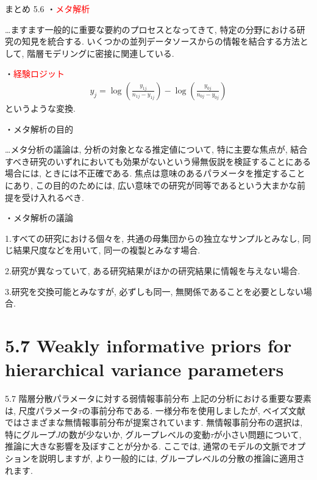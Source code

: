 \documentclass[10pt,dvipdfmx,a4]{beamer}
\newcommand{\eqn}[1]{\begin{align*}#1\end{align*}}
\newcommand{\tcr}[1]{\textcolor{red}{#1}}
\begin{document}

\begin{frame}{まとめ 5.6}
・\tcr{メタ解析}

…ますます一般的に重要な要約のプロセスとなってきて, 特定の分野における研究の知見を統合する.
いくつかの並列データソースからの情報を結合する方法として, 階層モデリングに密接に関連している.

・\tcr{経験ロジット}
\eqn{y_j=\log \left(\tfrac{y_{1j}}{n_{1j}-y_{1j}}\right)-\log \left(\tfrac{y_{0j}}{n_{0j}-y_{0j}}\right)}
というような変換.

・メタ解析の目的

…メタ分析の議論は, 分析の対象となる推定値について, 特に主要な焦点が, 結合すべき研究のいずれにおいても効果がないという帰無仮説を検証することにある場合には, ときには不正確である.
焦点は意味のあるパラメータを推定することにあり, この目的のためには, 広い意味での研究が同等であるという大まかな前提を受け入れるべき.
\end{frame}


\begin{frame}
・メタ解析の議論

1.すべての研究における個々を, 共通の母集団からの独立なサンプルとみなし, 同じ結果尺度などを用いて, 同一の複製とみなす場合.

2.研究が異なっていて, ある研究結果がほかの研究結果に情報を与えない場合.

3.研究を交換可能とみなすが, 必ずしも同一, 無関係であることを必要としない場合.

\end{frame}

\section{5.7 Weakly informative priors for hierarchical variance parameters}
\begin{frame}{5.7 階層分散パラメータに対する弱情報事前分布}
上記の分析における重要な要素は, 尺度パラメータ$\tau$の事前分布である.
一様分布を使用しましたが, ベイズ文献ではさまざまな無情報事前分布が提案されています.
無情報事前分布の選択は, 特にグループ$J$の数が少ないか, グループレベルの変動$\tau$が小さい問題について, 推論に大きな影響を及ぼすことが分かる.
ここでは, 通常のモデルの文脈でオプションを説明しますが, より一般的には, グループレベルの分散の推論に適用されます.
\end{frame}
\end{document}
